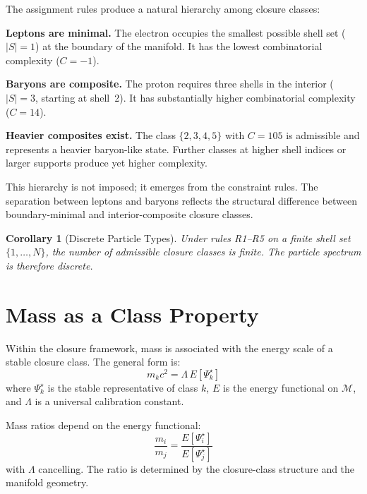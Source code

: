 \documentclass[12pt]{article}
\newtheorem{corollary}[theorem]{Corollary}
\newcommand{\Mcal}{\mathcal{M}}
\newcommand{\Psif}{\Psi}
\begin{document}
The assignment rules produce a natural hierarchy among closure classes:

\textbf{Leptons are minimal.} The electron occupies the smallest possible shell set ($|S| = 1$) at the boundary of the manifold. It has the lowest combinatorial complexity ($C = -1$).

\textbf{Baryons are composite.} The proton requires three shells in the interior ($|S| = 3$, starting at shell~2). It has substantially higher combinatorial complexity ($C = 14$).

\textbf{Heavier composites exist.} The class $\{2,3,4,5\}$ with $C = 105$ is admissible and represents a heavier baryon-like state. Further classes at higher shell indices or larger supports produce yet higher complexity.

This hierarchy is not imposed; it emerges from the constraint rules. The separation between leptons and baryons reflects the structural difference between boundary-minimal and interior-composite closure classes.

\begin{corollary}[Discrete Particle Types]
Under rules R1--R5 on a finite shell set $\{1, \ldots, N\}$, the number of admissible closure classes is finite. The particle spectrum is therefore discrete.
\end{corollary}

\section{Mass as a Class Property}\label{sec:mass}

Within the closure framework, mass is associated with the energy scale of a stable closure class. The general form is:
\begin{equation}
    m_k c^2 = \Lambda\, E[\Psif_k^\star]
\end{equation}
where $\Psif_k^\star$ is the stable representative of class $k$, $E$ is the energy functional on $\Mcal$, and $\Lambda$ is a universal calibration constant.

Mass ratios depend on the energy functional:
\begin{equation}
    \frac{m_i}{m_j} = \frac{E[\Psif_i^\star]}{E[\Psif_j^\star]}
\end{equation}
with $\Lambda$ cancelling. The ratio is determined by the closure-class structure and the manifold geometry.
\end{document}
